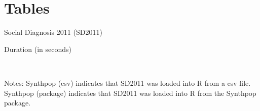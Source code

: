 \section{Tables}

\begin{table}[ht]
    \caption{Social Diagnosis 2011 (SD2011)}
    \centering
    \resizebox{.85\textwidth}{!}{}
    \label{table:sd2011_data_structure}
\end{table}


\begin{table}[ht]
    \centering
    \caption{Duration (in seconds)}
    \resizebox{.85\textwidth}{!}{}
    \label{table:table_sd2011_duration}
    \\
    \raggedright
    \tiny{Notes: Synthpop (csv) indicates that SD2011 was loaded into R from a csv file.  Synthpop (package) indicates that SD2011 was loaded into R from the Synthpop package.}
\end{table}
